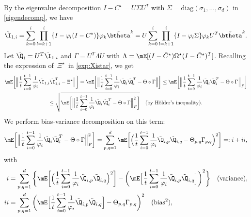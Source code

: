 By the eigenvalue decomposition $I-C^\star = U\Sigma U^T$ with $\Sigma=\text{diag}(\sigma_1,\dots,\sigma_d)$ in \eqref{eigendecomp}, we have
\begin{equation}\label{appen:A4:equ6}
\tilde{\I}_{1,i} = \sum_{k=0}^i\prod_{l=k+1}^i\{I-\varphi_l(I-C^\star)\}\varphi_k \tilde{\btheta}^k =U\sum_{k=0}^i\prod_{l=k+1}^i\{I-\varphi_l\Sigma\}\varphi_k U^T\tilde{\btheta}^k.
\end{equation}   
Let $\tilde{\Q}_i = U^T\tilde{\I}_{1,i}$ and $\Gamma = U^T\Lambda U$ with $\Lambda = \mE[(I- \tilde{C}^\star)\Omega^\star(I- \tilde{C}^\star)^T]$. Recalling the expression of~$\Xi^\star$~in \eqref{exp:Xistar}, we get
\begin{multline*}
\mE\bigg[\Big\|\frac{1}{t}\sum_{i=0}^{t-1}\frac{1}{\varphi_i}\tilde{\I}_{1,i}\tilde{\I}_{1,i}^T-\Xi^\star\Big\|\bigg] = 
\mE\bigg[\Big\|\frac{1}{t}\sum_{i=0}^{t-1}\frac{1}{\varphi_i}\tilde{\Q}_i\tilde{\Q}_i^T-\Theta\circ\Gamma\Big\|\bigg] \leq \mE\bigg[\Big\|\frac{1}{t}\sum_{i=0}^{t-1}\frac{1}{\varphi_i}\tilde{\Q}_i\tilde{\Q}_i^T-\Theta\circ\Gamma\Big\|_F\bigg]\\
\leq \sqrt{\mE\bigg[\Big\|\frac{1}{t}\sum_{i=0}^{t-1}\frac{1}{\varphi_i}\tilde{\Q}_i\tilde{\Q}_i^T-\Theta\circ\Gamma\Big\|_F^2\bigg]} \quad\text{(by H\"older's inequality)}.
\end{multline*}
We perform bias-variance decomposition on this term:
\begin{equation}\label{appen:A4:equ12}
\mE\bigg[\Big\|\frac{1}{t}\sum_{i=0}^{t-1}\frac{1}{\varphi_i}\tilde{\Q}_i\tilde{\Q}_i^T-\Theta\circ\Gamma\Big\|_F^2\bigg] = \sum_{p,q=1}^d \mE\bigg[\Big(\frac{1}{t} \sum_{i=0}^{t-1} \frac{1}{\varphi_i} \tilde{\Q}_{i, p} \tilde{\Q}_{i, q}-\Theta_{p,q}\Gamma_{p,q}\Big)^2\bigg] =: \uppercase\expandafter{\romannumeral1} + \uppercase\expandafter{\romannumeral2},
\end{equation}
with
\begin{align*}
\uppercase\expandafter{\romannumeral1} &= \sum_{p,q=1}^d\bigg\{\mE\bigg[\Big(\frac{1}{t} \sum_{i=0}^{t-1} \frac{1}{\varphi_i} \tilde{\Q}_{i, p} \tilde{\Q}_{i, q}\Big)^2\bigg]-\bigg(\mE\Big[\frac{1}{t} \sum_{i=0}^{t-1} \frac{1}{\varphi_i} \tilde{\Q}_{i, p} \tilde{\Q}_{i, q}\Big]\bigg)^2\bigg\} \quad (\text{variance}),\nonumber  \\
\uppercase\expandafter{\romannumeral2} &= \sum_{p,q=1}^d\bigg(\mE\Big[\frac{1}{t} \sum_{i=0}^{t-1} \frac{1}{\varphi_i} \tilde{\Q}_{i, p}\tilde{\Q}_{i, q}\Big]-\Theta_{p,q} \Gamma_{p,q}\bigg)^2\quad (\text{bias}^2),
\end{align*}

